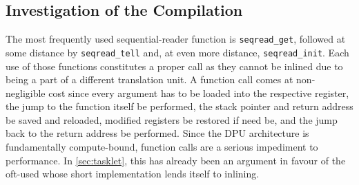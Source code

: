 \subsection{Investigation of the Compilation}
\label{sec:mram:merge:compilation}

\pgfmathsetmacro{\timeSaveStraightReg}{ \timeReaderReg / \timeReaderStraight }
\pgfmathsetmacro{\timeSaveOptReg}{ \timeReaderReg / \timeReaderOpt }
\pgfmathsetmacro{\timeSaveOptStraight}{ \timeReaderStraight / \timeReaderOpt }

The most frequently used sequential-reader function is \lstinline|seqread_get|, followed at some distance by \lstinline|seqread_tell| and, at even more distance, \lstinline|seqread_init|.
Each use of those functions constitutes a proper call as they cannot be inlined due to being a part of a different translation unit.
A function call comes at non-negligible cost since every argument has to be loaded into the respective register, the jump to the function itself be performed, the stack pointer and return address be saved and reloaded, modified registers be restored if need be, and the jump back to the return address be performed.
Since the \ac{DPU} architecture is fundamentally compute-bound, function calls are a serious impediment to performance.
In \cref{sec:tasklet}, this has already been an argument in favour of the oft-used \IS{} whose short implementation lends itself to inlining.

